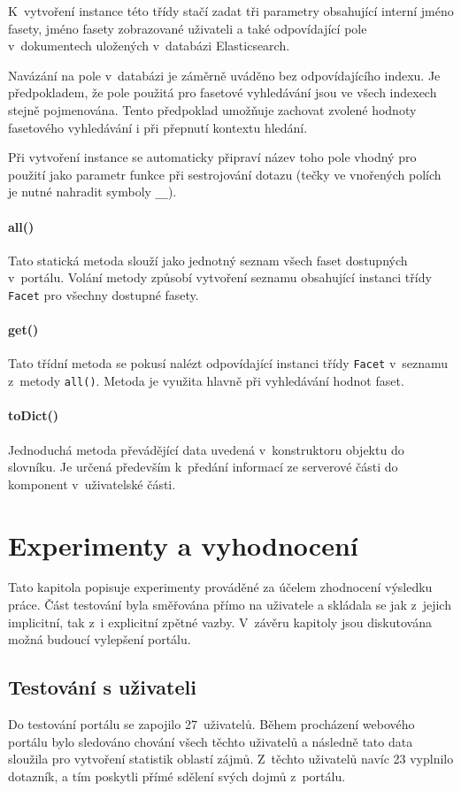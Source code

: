 K~vytvoření instance této třídy stačí zadat tři parametry obsahující interní jméno fasety, jméno fasety zobrazované uživateli a také odpovídající pole v~dokumentech uložených v~databázi Elasticsearch. 

Navázání na pole v~databázi je záměrně uváděno bez odpovídajícího indexu. Je předpokladem, že pole použitá pro fasetové vyhledávání jsou ve všech indexech stejně pojmenována. Tento předpoklad umožňuje zachovat zvolené hodnoty fasetového vyhledávání i při přepnutí kontextu hledání. 

Při vytvoření instance se automaticky připraví název toho pole vhodný pro použití jako parametr funkce při sestrojování dotazu (tečky ve vnořených polích je nutné nahradit symboly \texttt{\_\_}). 

\subsubsection*{all()}
Tato statická metoda slouží jako jednotný seznam všech faset dostupných v~portálu. Volání metody způsobí vytvoření seznamu obsahující instanci třídy \texttt{Facet} pro všechny dostupné fasety.

\subsubsection*{get()}
Tato třídní metoda se pokusí nalézt odpovídající instanci třídy \texttt{Facet} v~seznamu z~metody \texttt{all()}. Metoda je využita hlavně při vyhledávání hodnot faset.

\subsubsection*{toDict()}
Jednoduchá metoda převádějící data uvedená v~konstruktoru objektu do slovníku. Je určená především k~předání informací ze serverové části do komponent v~uživatelské části.



\chapter{Experimenty a vyhodnocení}
Tato kapitola popisuje experimenty prováděné za účelem zhodnocení výsledku práce. Část testování byla směřována přímo na uživatele a skládala se jak z~jejich implicitní, tak z~i explicitní zpětné vazby. V~závěru kapitoly jsou diskutována možná budoucí vylepšení portálu.

\section{Testování s uživateli}
Do testování portálu se zapojilo 27~uživatelů. Během procházení webového portálu bylo sledováno chování všech těchto uživatelů a následně tato data sloužila pro vytvoření statistik oblastí zájmů. Z~těchto uživatelů navíc 23 vyplnilo dotazník, a tím poskytli přímé sdělení svých dojmů z~portálu. 

